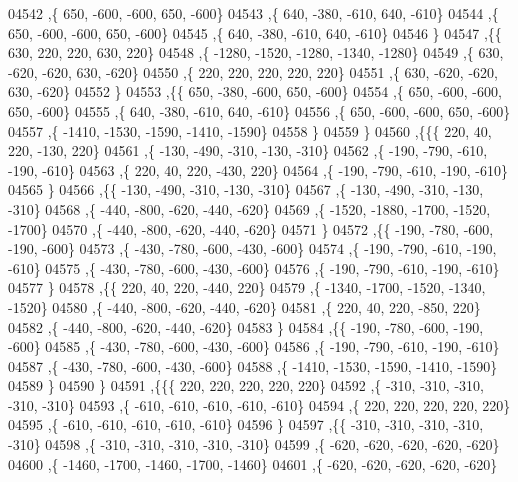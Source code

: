 \begin{DoxyCode}
04542     ,\{   650,  -600,  -600,   650,  -600\}
04543     ,\{   640,  -380,  -610,   640,  -610\}
04544     ,\{   650,  -600,  -600,   650,  -600\}
04545     ,\{   640,  -380,  -610,   640,  -610\}
04546     \}
04547    ,\{\{   630,   220,   220,   630,   220\}
04548     ,\{ -1280, -1520, -1280, -1340, -1280\}
04549     ,\{   630,  -620,  -620,   630,  -620\}
04550     ,\{   220,   220,   220,   220,   220\}
04551     ,\{   630,  -620,  -620,   630,  -620\}
04552     \}
04553    ,\{\{   650,  -380,  -600,   650,  -600\}
04554     ,\{   650,  -600,  -600,   650,  -600\}
04555     ,\{   640,  -380,  -610,   640,  -610\}
04556     ,\{   650,  -600,  -600,   650,  -600\}
04557     ,\{ -1410, -1530, -1590, -1410, -1590\}
04558     \}
04559    \}
04560   ,\{\{\{   220,    40,   220,  -130,   220\}
04561     ,\{  -130,  -490,  -310,  -130,  -310\}
04562     ,\{  -190,  -790,  -610,  -190,  -610\}
04563     ,\{   220,    40,   220,  -430,   220\}
04564     ,\{  -190,  -790,  -610,  -190,  -610\}
04565     \}
04566    ,\{\{  -130,  -490,  -310,  -130,  -310\}
04567     ,\{  -130,  -490,  -310,  -130,  -310\}
04568     ,\{  -440,  -800,  -620,  -440,  -620\}
04569     ,\{ -1520, -1880, -1700, -1520, -1700\}
04570     ,\{  -440,  -800,  -620,  -440,  -620\}
04571     \}
04572    ,\{\{  -190,  -780,  -600,  -190,  -600\}
04573     ,\{  -430,  -780,  -600,  -430,  -600\}
04574     ,\{  -190,  -790,  -610,  -190,  -610\}
04575     ,\{  -430,  -780,  -600,  -430,  -600\}
04576     ,\{  -190,  -790,  -610,  -190,  -610\}
04577     \}
04578    ,\{\{   220,    40,   220,  -440,   220\}
04579     ,\{ -1340, -1700, -1520, -1340, -1520\}
04580     ,\{  -440,  -800,  -620,  -440,  -620\}
04581     ,\{   220,    40,   220,  -850,   220\}
04582     ,\{  -440,  -800,  -620,  -440,  -620\}
04583     \}
04584    ,\{\{  -190,  -780,  -600,  -190,  -600\}
04585     ,\{  -430,  -780,  -600,  -430,  -600\}
04586     ,\{  -190,  -790,  -610,  -190,  -610\}
04587     ,\{  -430,  -780,  -600,  -430,  -600\}
04588     ,\{ -1410, -1530, -1590, -1410, -1590\}
04589     \}
04590    \}
04591   ,\{\{\{   220,   220,   220,   220,   220\}
04592     ,\{  -310,  -310,  -310,  -310,  -310\}
04593     ,\{  -610,  -610,  -610,  -610,  -610\}
04594     ,\{   220,   220,   220,   220,   220\}
04595     ,\{  -610,  -610,  -610,  -610,  -610\}
04596     \}
04597    ,\{\{  -310,  -310,  -310,  -310,  -310\}
04598     ,\{  -310,  -310,  -310,  -310,  -310\}
04599     ,\{  -620,  -620,  -620,  -620,  -620\}
04600     ,\{ -1460, -1700, -1460, -1700, -1460\}
04601     ,\{  -620,  -620,  -620,  -620,  -620\}

\end{DoxyCode}
